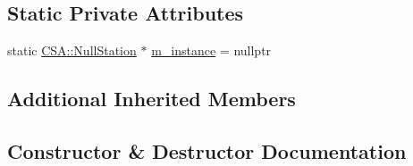 \subsection*{Static Private Attributes}
\begin{DoxyCompactItemize}
\item 
static \mbox{\hyperlink{classCSA_1_1NullStation}{C\+S\+A\+::\+Null\+Station}} $\ast$ \mbox{\hyperlink{classCSA_1_1NullStation_a691ee7698fd8e06c982daf1c8daf1e75}{m\+\_\+instance}} = nullptr
\end{DoxyCompactItemize}
\subsection*{Additional Inherited Members}


\subsection{Constructor \& Destructor Documentation}
\mbox{\label{classCSA_1_1NullStation_ac383e83e8ad47350e82b68a7c6e7b980}} 
